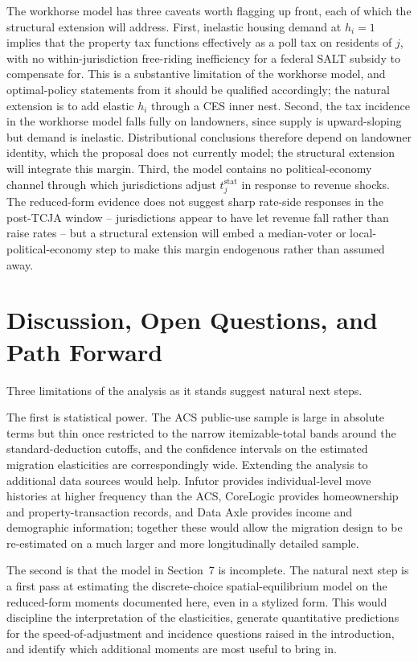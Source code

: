 \documentclass[12pt]{article}
\begin{document}
The workhorse model has three caveats worth flagging up front, each of which the structural extension will address. First, inelastic housing demand at $h_i = 1$ implies that the property tax functions effectively as a poll tax on residents of $j$, with no within-jurisdiction free-riding inefficiency for a federal SALT subsidy to compensate for. This is a substantive limitation of the workhorse model, and optimal-policy statements from it should be qualified accordingly; the natural extension is to add elastic $h_i$ through a CES inner nest. Second, the tax incidence in the workhorse model falls fully on landowners, since supply is upward-sloping but demand is inelastic. Distributional conclusions therefore depend on landowner identity, which the proposal does not currently model; the structural extension will integrate this margin. Third, the model contains no political-economy channel through which jurisdictions adjust $t^{\text{stat}}_j$ in response to revenue shocks. The reduced-form evidence does not suggest sharp rate-side responses in the post-TCJA window -- jurisdictions appear to have let revenue fall rather than raise rates -- but a structural extension will embed a median-voter or local-political-economy step to make this margin endogenous rather than assumed away.


\section{Discussion, Open Questions, and Path Forward}

Three limitations of the analysis as it stands suggest natural next steps.

The first is statistical power. The ACS public-use sample is large in absolute terms but thin once restricted to the narrow itemizable-total bands around the standard-deduction cutoffs, and the confidence intervals on the estimated migration elasticities are correspondingly wide. Extending the analysis to additional data sources would help. Infutor provides individual-level move histories at higher frequency than the ACS, CoreLogic provides homeownership and property-transaction records, and Data Axle provides income and demographic information; together these would allow the migration design to be re-estimated on a much larger and more longitudinally detailed sample.

The second is that the model in Section~7 is incomplete. The natural next step is a first pass at estimating the discrete-choice spatial-equilibrium model on the reduced-form moments documented here, even in a stylized form. This would discipline the interpretation of the elasticities, generate quantitative predictions for the speed-of-adjustment and incidence questions raised in the introduction, and identify which additional moments are most useful to bring in.
\end{document}
